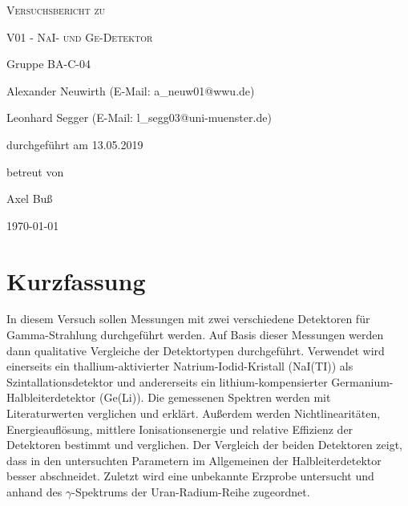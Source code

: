 \documentclass[
	a4paper,
	12pt,
	pagesize,
	ngerman
]{scrartcl}
\begin{document}
	\begin{titlepage}
		\centering
		{\scshape\LARGE Versuchsbericht zu \par}
		\vspace{1cm}
		{\scshape\huge V01 - NaI- und Ge-Detektor \par}
		\vspace{2.5cm}
		{\LARGE Gruppe BA-C-04 \par}
		\vspace{0.5cm}

		{\large Alexander Neuwirth (E-Mail: a\_neuw01@wwu.de) \par}
		{\large Leonhard Segger (E-Mail: l\_segg03@uni-muenster.de) \par}
		\vfill

		durchgeführt am 13.05.2019\par
		betreut von\par
		{\large Axel Buß}

		\vfill

		{\large \today\par}
	\end{titlepage}
	\tableofcontents
	\newpage

	\section{Kurzfassung}
	In diesem Versuch sollen Messungen mit zwei verschiedene Detektoren für Gamma-Strahlung durchgeführt werden.
	Auf Basis dieser Messungen werden dann qualitative Vergleiche der Detektortypen durchgeführt.
	Verwendet wird einerseits ein thallium-aktivierter Natrium-Iodid-Kristall (NaI(TI)) als Szintallationsdetektor und andererseits ein lithium-kompensierter Germanium-Halbleiterdetektor (Ge(Li)).
	Die gemessenen Spektren werden mit Literaturwerten verglichen und erklärt.
	Außerdem werden Nichtlinearitäten, Energieauflösung, mittlere Ionisationsenergie und relative Effizienz der Detektoren bestimmt und verglichen.
	Der Vergleich der beiden Detektoren zeigt, dass in den untersuchten Parametern im Allgemeinen der Halbleiterdetektor besser abschneidet.
	Zuletzt wird eine unbekannte Erzprobe untersucht und anhand des $\gamma$-Spektrums der Uran-Radium-Reihe zugeordnet.
\end{document}
